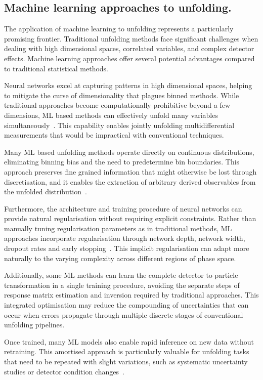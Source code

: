 \subsection{Machine learning approaches to unfolding.}

The application of machine learning to unfolding represents a particularly promising frontier.
%
Traditional unfolding methods face significant challenges when dealing with high dimensional spaces, correlated variables, and complex detector effects.
%
Machine learning approaches offer several potential advantages compared to traditional statistical methods.

Neural networks excel at capturing patterns in high dimensional spaces, helping to mitigate the curse of dimensionality that plagues binned methods.
%
While traditional approaches become computationally prohibitive beyond a few dimensions, ML based methods can effectively unfold many variables simultaneously~\cite{komiske_preserving_2021}.
%
This capability enables jointly unfolding multidifferential measurements that would be impractical with conventional techniques.

Many ML based unfolding methods operate directly on continuous distributions, eliminating binning bias and the need to predetermine bin boundaries.
%
This approach preserves fine grained information that might otherwise be lost through discretisation, and it enables the extraction of arbitrary derived observables from the unfolded distribution~\cite{Shmakov2025FullDiffusion}.

Furthermore, the architecture and training procedure of neural networks can provide natural regularisation without requiring explicit constraints.
%
Rather than manually tuning regularisation parameters as in traditional methods, ML approaches incorporate regularisation through network depth, network width, dropout rates and early stopping~\cite{Girosi1995RegularizationArchitectures}.
%
This implicit regularisation can adapt more naturally to the varying complexity across different regions of phase space.

Additionally, some ML methods can learn the complete detector to particle transformation in a single training procedure, avoiding the separate steps of response matrix estimation and inversion required by traditional approaches.
%
This integrated optimisation may reduce the compounding of uncertainties that can occur when errors propagate through multiple discrete stages of conventional unfolding pipelines.

Once trained, many ML models also enable rapid inference on new data without retraining.
%
This amortised approach is particularly valuable for unfolding tasks that need to be repeated with slight variations, such as systematic uncertainty studies or detector condition changes~\cite{Brehmer2020EffectiveLearning}.

